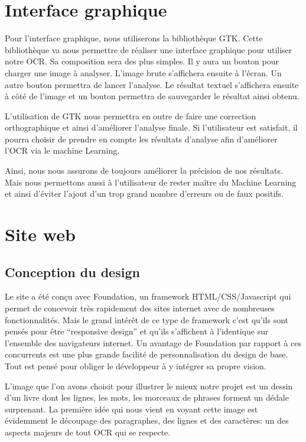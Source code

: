 \documentclass[11pt]{report}
\begin{document}

\chapter{Interface graphique}

Pour l'interface graphique, nous utiliserons la bibliothèque GTK. Cette bibliothèque va nous permettre de réaliser une interface graphique pour utiliser notre OCR. Sa composition sera des plus simples. Il y aura un bouton pour charger une image à analyser. L'image brute s'affichera ensuite à l'écran. Un autre bouton permettra de lancer l'analyse. Le résultat textuel s'affichera ensuite à côté de l'image et un bouton permettra de sauvegarder le résultat ainsi obtenu.

L'utilisation de GTK nous permettra en outre de faire une correction orthographique et ainsi d'améliorer l'analyse finale. Si l'utilisateur est satisfait, il pourra choisir de prendre en compte les résultats d'analyse afin d'améliorer l'OCR via le machine Learning.

Ainsi, nous nous assurons de toujours améliorer la précision de nos résultats. Mais nous permettons aussi à l'utilisateur de rester maître du Machine Learning et ainsi d'éviter l'ajout d'un trop grand nombre d'erreurs ou de faux positifs.

\chapter{Site web}

\section{Conception du design}

Le site a été conçu avec Foundation, un framework HTML/CSS/Javascript qui permet de concevoir très rapidement des sites internet avec de nombreuses fonctionnalités. Mais le grand intérêt de ce type de framework c’est qu’ils sont pensés pour être “responsive design” et qu’ils s’affichent à l’identique sur l’ensemble des navigateurs internet. Un avantage de Foundation par rapport à ces concurrents est une plus grande facilité de personnalisation du design de base. Tout est pensé pour obliger le développeur à y intégrer sa propre vision.

L'image que l'on avons choisit pour illustrer le mieux notre projet est un dessin d'un livre dont les lignes, les mots, les morceaux de phrases forment un dédale surprenant. La première idée qui nous vient en voyant cette image est évidemment le découpage des paragraphes, des lignes et des caractères: un des aspects majeurs de tout OCR qui se respecte.
\end{document}
